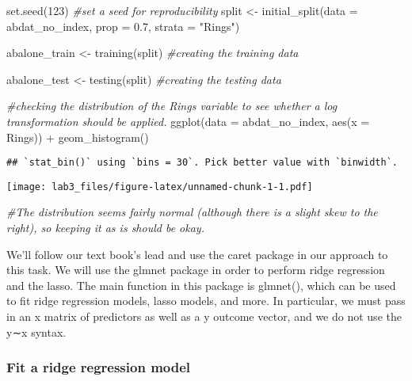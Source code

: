 \documentclass[
]{article}
\newenvironment{Shaded}{\begin{snugshade}}{\end{snugshade}}
\newcommand{\AttributeTok}[1]{\textcolor[rgb]{0.77,0.63,0.00}{#1}}
\newcommand{\CommentTok}[1]{\textcolor[rgb]{0.56,0.35,0.01}{\textit{#1}}}
\newcommand{\DecValTok}[1]{\textcolor[rgb]{0.00,0.00,0.81}{#1}}
\newcommand{\FloatTok}[1]{\textcolor[rgb]{0.00,0.00,0.81}{#1}}
\newcommand{\FunctionTok}[1]{\textcolor[rgb]{0.00,0.00,0.00}{#1}}
\newcommand{\NormalTok}[1]{#1}
\newcommand{\OtherTok}[1]{\textcolor[rgb]{0.56,0.35,0.01}{#1}}
\newcommand{\SpecialCharTok}[1]{\textcolor[rgb]{0.00,0.00,0.00}{#1}}
\newcommand{\StringTok}[1]{\textcolor[rgb]{0.31,0.60,0.02}{#1}}
\begin{document}
\begin{Shaded}
\begin{Highlighting}[]
\FunctionTok{set.seed}\NormalTok{(}\DecValTok{123}\NormalTok{) }\CommentTok{\#set a seed for reproducibility}
\NormalTok{split }\OtherTok{\textless{}{-}} \FunctionTok{initial\_split}\NormalTok{(}\AttributeTok{data =}\NormalTok{ abdat\_no\_index,}
                       \AttributeTok{prop =} \FloatTok{0.7}\NormalTok{, }
                       \AttributeTok{strata =} \StringTok{"Rings"}\NormalTok{)}

\NormalTok{abalone\_train }\OtherTok{\textless{}{-}} \FunctionTok{training}\NormalTok{(split) }\CommentTok{\#creating the training data}

\NormalTok{abalone\_test }\OtherTok{\textless{}{-}} \FunctionTok{testing}\NormalTok{(split) }\CommentTok{\#creating the testing data}


\CommentTok{\#checking the distribution of the Rings variable to see whether a log transformation should be applied. }
\FunctionTok{ggplot}\NormalTok{(}\AttributeTok{data =}\NormalTok{ abdat\_no\_index, }\FunctionTok{aes}\NormalTok{(}\AttributeTok{x =}\NormalTok{ Rings)) }\SpecialCharTok{+}
  \FunctionTok{geom\_histogram}\NormalTok{() }
\end{Highlighting}
\end{Shaded}

\begin{verbatim}
## `stat_bin()` using `bins = 30`. Pick better value with `binwidth`.
\end{verbatim}

\texttt{[image: lab3\_files/figure-latex/unnamed-chunk-1-1.pdf]}

\begin{Shaded}
\begin{Highlighting}[]
\CommentTok{\#The distribution seems fairly normal (although there is a slight skew to the right), so keeping it as is should be okay. }
\end{Highlighting}
\end{Shaded}

We'll follow our text book's lead and use the caret package in our
approach to this task. We will use the glmnet package in order to
perform ridge regression and the lasso. The main function in this
package is glmnet(), which can be used to fit ridge regression models,
lasso models, and more. In particular, we must pass in an x matrix of
predictors as well as a y outcome vector, and we do not use the y∼x
syntax.

\hypertarget{fit-a-ridge-regression-model}{%
\subsubsection{Fit a ridge regression
model}\label{fit-a-ridge-regression-model}}
\end{document}
